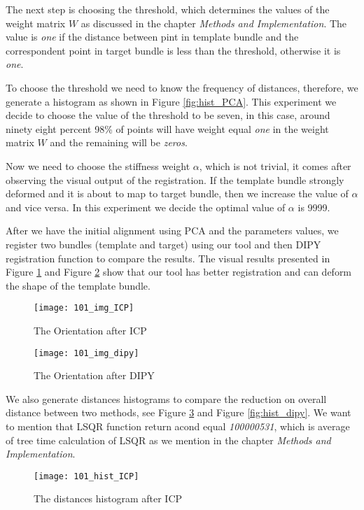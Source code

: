 \documentclass[../structure.tex]{subfiles}
\begin{document}
The next step is choosing the threshold, which determines the values of the weight matrix $W$ as discussed in the chapter \textit{Methods and Implementation}. The value  is \textit{one} if the distance between pint in template bundle and the correspondent point in target bundle is less than the threshold, otherwise it is \textit{one}. 

To choose the threshold we need to know the frequency of distances, therefore, we generate a histogram as shown in Figure \ref{fig:hist_PCA}. This experiment we decide to choose the value of the threshold to be seven, in this case, around ninety eight percent 98\% of points will have weight equal \textit{one} in the weight matrix $W$ and the remaining will be \textit{zeros}.

Now we need to choose the stiffness weight $\alpha$, which is not trivial, it comes after observing the visual output of the registration. If the template bundle strongly deformed and it is about to map to target bundle, then we increase the value of $\alpha$ and vice versa. In this experiment we decide the optimal value of $\alpha$ is 9999.

After we have the initial alignment using PCA and the parameters values, we register two bundles (template and target) using our tool and then DIPY registration function to compare the results. The visual results presented in Figure \ref{fig:img_ICP} and Figure \ref{fig:img_dipy} show that our tool has better registration and can deform the shape of the template bundle.

\begin{figure}[h!]
\centering
\texttt{[image: 101\_img\_ICP]}
\captionsetup{justification=centering}
\caption{The Orientation after ICP}
\label{fig:img_ICP}
\end{figure}

\begin{figure}[h!]
\centering
\texttt{[image: 101\_img\_dipy]}
\captionsetup{justification=centering}
\caption{The Orientation after DIPY}
\label{fig:img_dipy}
\end{figure}

We also generate distances histograms to compare the reduction on overall distance between two methods, see Figure \ref{fig:hist_ICP} and Figure \ref{fig:hist_dipy}. We want to mention that LSQR function return acond equal \textit{100000531}, which is average of tree time calculation of LSQR as we mention in the chapter \textit{Methods and Implementation}.

\begin{figure}[h!]
\centering
\texttt{[image: 101\_hist\_ICP]}
\captionsetup{justification=centering}
\caption{The distances histogram after ICP}
\label{fig:hist_ICP}
\end{figure}
\end{document}
